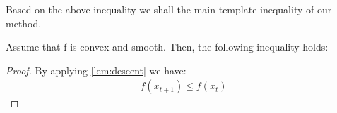 Based on the above inequality we shall the main template inequality of our method.

\begin{prop}
Assume that f is convex and smooth. Then, the following inequality holds:
\end{prop}

\begin{proof}
  By applying \cref{lem:descent} we have:
  \begin{align}
      f(x_{t+1})\leq f(x_{t})
  \end{align}
\end{proof}